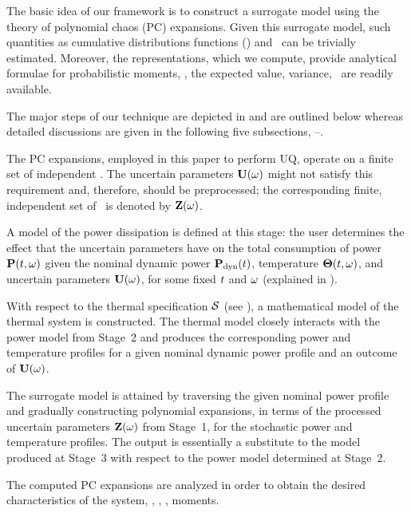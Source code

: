 The basic idea of our framework is to construct a surrogate model using the theory of polynomial chaos (PC) expansions. Given this surrogate model, such quantities as cumulative distributions functions (\cdfs) and \pdfs\ can be trivially estimated. Moreover, the representations, which we compute, provide analytical formulae for probabilistic moments, \ie, the expected value, variance, \etc\ are readily available.

The major steps of our technique are depicted in  and are outlined below whereas detailed discussions are given in the following five subsections, --.

 The PC expansions, employed in this paper to perform UQ, operate on a finite set of independent \rvs. The uncertain parameters $\mathbf{U}(\omega)$ might not satisfy this requirement and, therefore, should be preprocessed; the corresponding finite, independent set of \rvs\ is denoted by $\mathbf{Z}(\omega)$.

 A model of the power dissipation is defined at this stage: the user determines the effect that the uncertain parameters have on the total consumption of power $\mathbf{P}(t, \omega)$ given the nominal dynamic power $\mathbf{P}_{\text{dyn}}(t)$, temperature ${\boldsymbol\Theta}(t, \omega)$, and uncertain parameters $\mathbf{U}(\omega)$, for some fixed $t$ and $\omega$ (explained in ).

 With respect to the thermal specification $\mathcal{S}$ (see ), a mathematical model of the thermal system is constructed. The thermal model closely interacts with the power model from Stage~2 and produces the corresponding power and temperature profiles for a given nominal dynamic power profile and an outcome of $\mathbf{U}(\omega)$.

 The surrogate model is attained by traversing the given nominal power profile and gradually constructing polynomial expansions, in terms of the processed uncertain parameters $\mathbf{Z}(\omega)$ from Stage~1, for the stochastic power and temperature profiles. The output is essentially a substitute to the model produced at Stage~3 with respect to the power model determined at Stage~2.

 The computed PC expansions are analyzed in order to obtain the desired characteristics of the system, \eg, \cdfs, \pdfs, moments.

